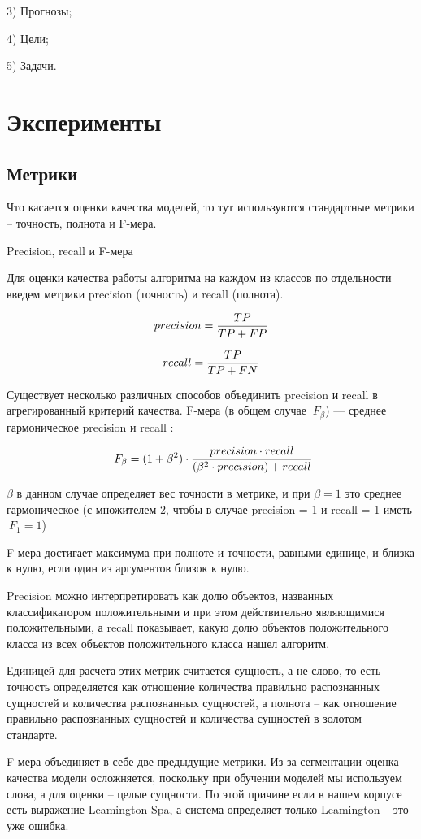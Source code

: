 \documentclass{article}
\begin{document}
3) Прогнозы;

4) Цели;

5) Задачи.


\section{Эксперименты}
\subsection{Метрики}
Что касается оценки качества моделей, то тут используются стандартные метрики – точность, полнота и F-мера. 

Precision, recall и F-мера

Для оценки качества работы алгоритма на каждом из классов по отдельности введем метрики precision (точность) и recall (полнота).


$$\large precision = \frac{TP}{TP + FP}$$



$$\large recall = \frac{TP}{TP + FN}$$

Существует несколько различных способов объединить precision и recall в агрегированный критерий качества. F-мера (в общем случае $\ F_\beta$) — среднее гармоническое precision и recall :


$$\large \ F_\beta = (1 + \beta^2) \cdot \frac{precision \cdot recall}{(\beta^2 \cdot precision) + recall}$$


$\beta$ в данном случае определяет вес точности в метрике, и при $\beta = 1$ это среднее гармоническое (с множителем 2, чтобы в случае precision = 1 и recall = 1 иметь $\ F_1 = 1$)

F-мера достигает максимума при полноте и точности, равными единице, и близка к нулю, если один из аргументов близок к нулю.

Precision можно интерпретировать как долю объектов, названных классификатором положительными и при этом действительно являющимися положительными, а recall показывает, какую долю объектов положительного класса из всех объектов положительного класса нашел алгоритм.

Единицей для расчета этих метрик считается сущность, а не слово, то есть точность определяется как отношение количества правильно распознанных сущностей и количества распознанных сущностей, а полнота – как отношение правильно распознанных сущностей и количества сущностей в золотом стандарте. 

F-мера объединяет в себе две предыдущие метрики.
Из-за сегментации оценка качества модели осложняется, поскольку при обучении моделей мы используем слова, а для оценки – целые сущности. По этой причине если в нашем корпусе есть выражение Leamington Spa, а система определяет только Leamington – это уже ошибка.
\end{document}
